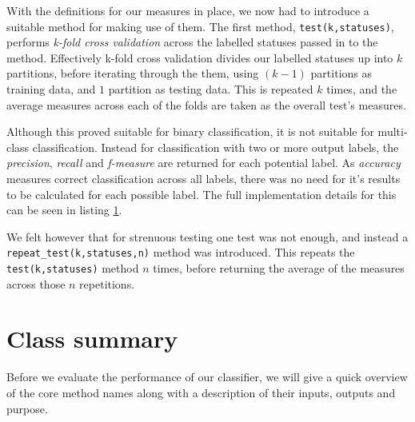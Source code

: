 With the definitions for our measures in place, we now had to introduce a suitable method for making use of them. The first method, \texttt{test(k,statuses)}, performs \emph{k-fold cross validation} across the labelled statuses passed in to the method. Effectively k-fold cross validation divides our labelled statuses up into $k$ partitions, before iterating through the them, using $(k-1)$ partitions as training data, and $1$ partition as testing data. This is repeated $k$ times, and the average measures across each of the folds are taken as the overall test's measures.

Although this proved suitable for binary classification, it is not suitable for multi-class classification. Instead for classification with two or more output labels, the \emph{precision}, \emph{recall} and \emph{f-measure} are returned for each potential label. As \emph{accuracy} measures correct classification across all labels, there was no need for it's results to be calculated for each possible label. The full implementation details for this can be seen in listing \ref{}.

We felt however that for strenuous testing one test was not enough, and instead a \texttt{repeat\_test(k,statuses,n)} method was introduced. This repeats the \texttt{test(k,statuses)} method $n$ times, before returning the average of the measures across those $n$ repetitions.

\section{Class summary}

Before we evaluate the performance of our classifier, we will give a quick overview of the core method names along with a description of their inputs, outputs and purpose.

